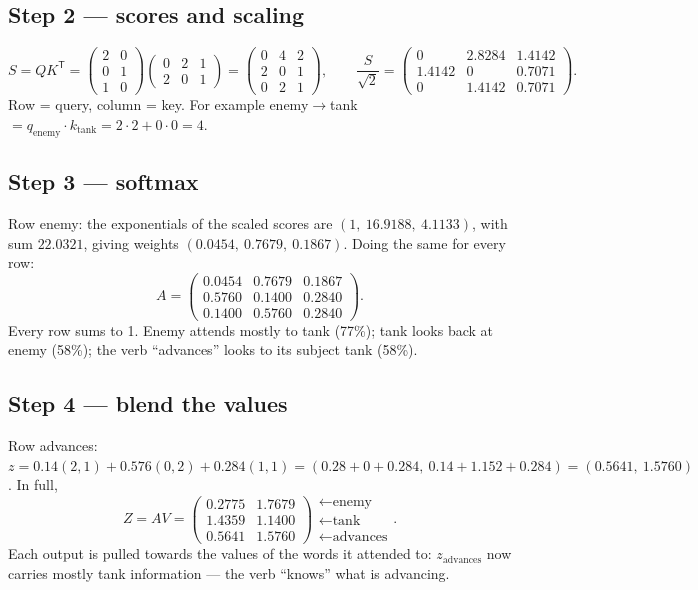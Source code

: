 \documentclass[11pt]{article}
\begin{document}
\subsection{Step 2 --- scores and scaling}
\[S=QK^{\mathsf T}=\begin{pmatrix}2&0\\0&1\\1&0\end{pmatrix}\begin{pmatrix}0&2&1\\2&0&1\end{pmatrix}=\begin{pmatrix}0&4&2\\2&0&1\\0&2&1\end{pmatrix},\qquad \frac{S}{\sqrt2}=\begin{pmatrix}0&2.8284&1.4142\\1.4142&0&0.7071\\0&1.4142&0.7071\end{pmatrix}.\]
Row = query, column = key. For example enemy$\to$tank $=q_{\text{enemy}}\cdot k_{\text{tank}}=2\cdot2+0\cdot0=4$.

\subsection{Step 3 --- softmax}
Row enemy: the exponentials of the scaled scores are $(1,\ 16.9188,\ 4.1133)$, with sum $22.0321$, giving weights $(0.0454,\ 0.7679,\ 0.1867)$. Doing the same for every row:
\[A=\begin{pmatrix}0.0454&0.7679&0.1867\\0.5760&0.1400&0.2840\\0.1400&0.5760&0.2840\end{pmatrix}.\]
Every row sums to 1. Enemy attends mostly to tank (77\%); tank looks back at enemy (58\%); the verb ``advances'' looks to its subject tank (58\%).

\subsection{Step 4 --- blend the values}
Row advances: $z=0.14(2,1)+0.576(0,2)+0.284(1,1)=(0.28+0+0.284,\ 0.14+1.152+0.284)=(0.5641,\ 1.5760)$. In full,
\[Z=AV=\begin{pmatrix}0.2775&1.7679\\1.4359&1.1400\\0.5641&1.5760\end{pmatrix}\!\begin{matrix}\leftarrow\text{enemy}\\\leftarrow\text{tank}\\\leftarrow\text{advances}\end{matrix}.\]
Each output is pulled towards the values of the words it attended to: $z_{\text{advances}}$ now carries mostly tank information --- the verb ``knows'' what is advancing.
\end{document}
